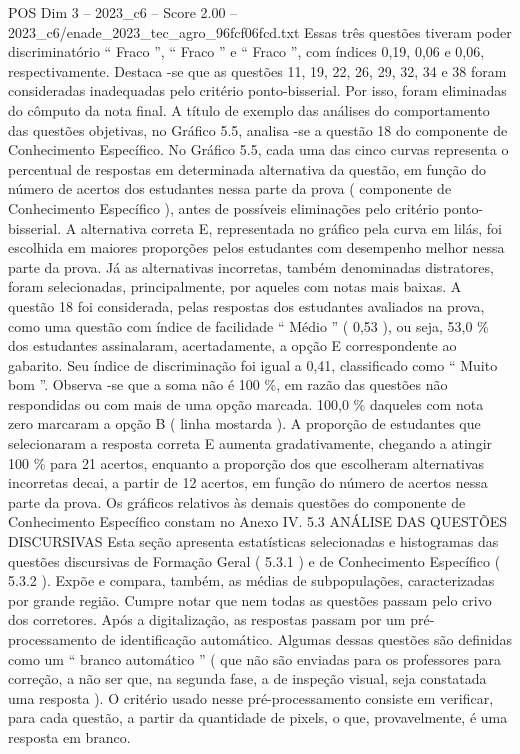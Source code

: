 \begin{textsample}{POS Dim 3 – 2023\_c6 – Score 2.00 – 2023\_c6/enade\_2023\_tec\_agro\_96fcf06fcd.txt}
Essas três questões tiveram poder discriminatório “ Fraco ”, “ Fraco ” e “ Fraco ”, com índices 0,19, 0,06 e 0,06, respectivamente.
Destaca -se que as questões 11, 19, 22, 26, 29, 32, 34 e 38 foram consideradas inadequadas pelo critério ponto-bisserial.
Por isso, foram eliminadas do cômputo da nota final.
A título de exemplo das análises do comportamento das questões objetivas, no Gráfico 5.5, analisa -se a questão 18 do componente de Conhecimento Específico.
No Gráfico 5.5, cada uma das cinco curvas representa o percentual de respostas em determinada alternativa da questão, em função do número de acertos dos estudantes nessa parte da prova ( componente de Conhecimento Específico ), antes de possíveis eliminações pelo critério ponto-bisserial.
A alternativa correta E, representada no gráfico pela curva em lilás, foi escolhida em maiores proporções pelos estudantes com desempenho melhor nessa parte da prova.
Já as alternativas incorretas, também denominadas distratores, foram selecionadas, principalmente, por aqueles com notas mais baixas.
A questão 18 foi considerada, pelas respostas dos estudantes avaliados na prova, como uma questão com índice de facilidade “ Médio ” ( 0,53 ), ou seja, 53,0 \% dos estudantes assinalaram, acertadamente, a opção E correspondente ao gabarito.
Seu índice de discriminação foi igual a 0,41, classificado como “ Muito bom ”.
Observa -se que a soma não é 100 \%, em razão das questões não respondidas ou com mais de uma opção marcada. 100,0 \% daqueles com nota zero marcaram a opção B ( linha mostarda ).
A proporção de estudantes que selecionaram a resposta correta E aumenta gradativamente, chegando a atingir 100 \% para 21 acertos, enquanto a proporção dos que escolheram alternativas incorretas decai, a partir de 12 acertos, em função do número de acertos nessa parte da prova.
Os gráficos relativos às demais questões do componente de Conhecimento Específico constam no Anexo IV. 5.3 ANÁLISE DAS QUESTÕES DISCURSIVAS Esta seção apresenta estatísticas selecionadas e histogramas das questões discursivas de Formação Geral ( 5.3.1 ) e de Conhecimento Específico ( 5.3.2 ).
Expõe e compara, também, as médias de subpopulações, caracterizadas por grande região.
Cumpre notar que nem todas as questões passam pelo crivo dos corretores.
Após a digitalização, as respostas passam por um pré-processamento de identificação automático.
Algumas dessas questões são definidas como um “ branco automático ” ( que não são enviadas para os professores para correção, a não ser que, na segunda fase, a de inspeção visual, seja constatada uma resposta ).
O critério usado nesse pré-processamento consiste em verificar, para cada questão, a partir da quantidade de pixels, o que, provavelmente, é uma resposta em branco.

\end{textsample}
